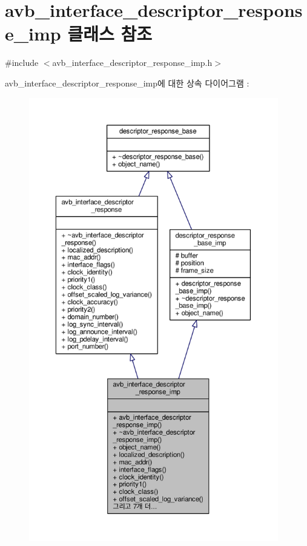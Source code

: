 \hypertarget{classavdecc__lib_1_1avb__interface__descriptor__response__imp}{}\section{avb\+\_\+interface\+\_\+descriptor\+\_\+response\+\_\+imp 클래스 참조}
\label{classavdecc__lib_1_1avb__interface__descriptor__response__imp}


{\ttfamily \#include $<$avb\+\_\+interface\+\_\+descriptor\+\_\+response\+\_\+imp.\+h$>$}



avb\+\_\+interface\+\_\+descriptor\+\_\+response\+\_\+imp에 대한 상속 다이어그램 \+: 
\nopagebreak
\begin{figure}[H]
\begin{center}
\leavevmode
\includegraphics[height=550pt]{classavdecc__lib_1_1avb__interface__descriptor__response__imp__inherit__graph}
\end{center}
\end{figure}


